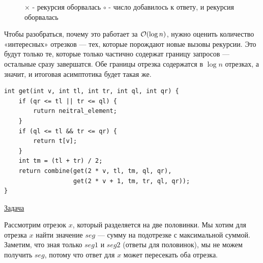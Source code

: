 \begin{center}
	\begin{figure}[h]
		\captionsetup{font=small, labelformat=empty}
		\caption{$\times$ - рекурсия оборвалась $\circ$ - число добавилось к ответу, и рекурсия оборвалась}
		\label{fig:image}
	\end{figure}
\end{center}

Чтобы разобраться, почему это работает за $\mathcal{O}(\log n)$, нужно оценить количество «интересных» отрезков --- тех, которые порождают новые вызовы рекурсии. Это будут только те, которые только частично содержат границу запросов — остальные сразу завершатся. Обе границы отрезка содержатся в $\log n$ отрезках, а значит, и итоговая асимптотика будет такая же.

\begin{verbatim}
int get(int v, int tl, int tr, int ql, int qr) {
	if (qr <= tl || tr <= ql) {
		ruturn neitral_element;
	}
	if (ql <= tl && tr <= qr) {
		return t[v];
	}
	int tm = (tl + tr) / 2;
	return combine(get(2 * v, tl, tm, ql, qr),
	               get(2 * v + 1, tm, tr, ql, qr));
}
\end{verbatim}

\pagebreak

 \href{https://codeforces.com/edu/course/2/lesson/4/2/practice/contest/273278/problem/A}{Задача}

Рассмотрим отрезок $x$, который разделяется на две половинки. Мы хотим для отрезка $x$ найти значение $seg$ — сумму на подотрезке с максимальной суммой. Заметим, что зная только $seg1$ и $seg2$ (ответы для половинок), мы не можем получить $seg$, потому что ответ для $x$ может пересекать оба отрезка.
\down

